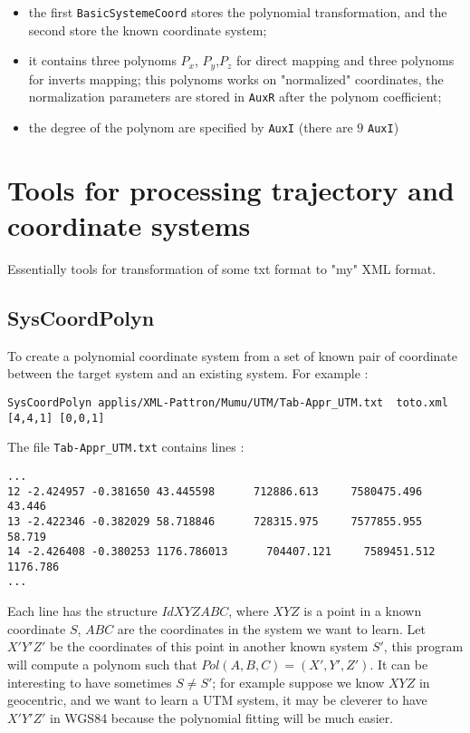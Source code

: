 \begin{itemize}
   \item  the first {\tt BasicSystemeCoord} stores the polynomial transformation, and the
          second store the known coordinate system;

   \item  it contains three polynoms $P_x$, $P_y$,$P_z$ for direct mapping
          and three polynoms for inverts mapping; this polynoms works on "normalized"
          coordinates,  the normalization parameters are stored in {\tt AuxR}
          after the polynom coefficient;

   \item  the degree of the polynom are specified by {\tt AuxI} (there are $9$ {\tt AuxI})

\end{itemize}


\section{Tools for processing trajectory and coordinate systems}

Essentially tools for transformation of some txt format to "my" XML format.

\subsection{SysCoordPolyn}


To create a polynomial coordinate system from a set of known pair of coordinate
between the target system and an existing system. For example :

\begin{verbatim}
SysCoordPolyn applis/XML-Pattron/Mumu/UTM/Tab-Appr_UTM.txt  toto.xml [4,4,1] [0,0,1]
\end{verbatim}

The file {\tt Tab-Appr\_UTM.txt} contains lines :


\begin{verbatim}
...
12 -2.424957 -0.381650 43.445598      712886.613     7580475.496         43.446
13 -2.422346 -0.382029 58.718846      728315.975     7577855.955         58.719
14 -2.426408 -0.380253 1176.786013      704407.121     7589451.512       1176.786
...
\end{verbatim}

Each line has the structure $Id X Y Z A B C$, where $X Y Z$ is a point
in a known coordinate  $S$,  $A B C$ are the coordinates in the system we want to
learn.  Let $X' Y' Z'$ be the coordinates of this point in another known system $S'$, this program will
compute a polynom such that $Pol(A,B,C)=(X',Y',Z')$. It can be interesting to have
sometimes $S \neq S'$; for example suppose we know $X Y Z$ in geocentric,
and we want to learn a UTM system, it may be cleverer to have $X' Y' Z'$ in WGS84
because the polynomial fitting will be much easier.

